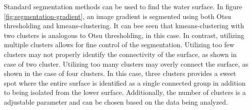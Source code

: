 Standard segmentation methods can be used to find the water surface.
In figure \ref{fig:segmentation-gradient}, an image gradient is segmented using both Otsu thresholding and kmeans-clustering.
It can bee seen that kmeans-clustering with two clusters is analogous to Otsu thresholding, in this case.
In contrast, utilizing multiple clusters allows for fine control of the segmentation.
Utilizing too few clusters may not properly identify the connectivity of the surface, as shown in case of two cluster.
Utilizing too many clusters may overly connect the surface, as shown in the case of four clusters.
In this case, three clusters provides a sweet spot where the entire surface is identified as a single connected group in addition to being isolated from the lower surface.
Additionally, the number of clusters is a adjustable parameter and can be chosen based on the data being analyzed.
%
